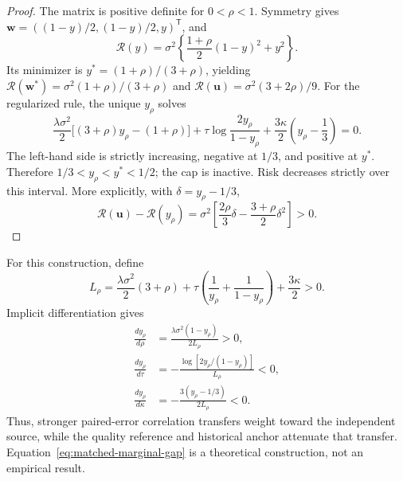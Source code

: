 \begin{proof}
The matrix is positive definite for $0<\rho<1$. Symmetry gives
$\boldsymbol w=((1-y)/2,(1-y)/2,y)^{\mathsf T}$, and
\begin{equation}
 \mathcal R(y)=\sigma^2\left\{
 \frac{1+\rho}{2}(1-y)^2+y^2\right\}.
\end{equation}
Its minimizer is $y^*=(1+\rho)/(3+\rho)$, yielding
$\mathcal R(\boldsymbol w^*)=\sigma^2(1+\rho)/(3+\rho)$ and
$\mathcal R(\boldsymbol u)=\sigma^2(3+2\rho)/9$.
For the regularized rule, the unique $y_\rho$ solves
\begin{equation}
 \frac{\lambda\sigma^2}{2}
 \big[(3+\rho)y_\rho-(1+\rho)\big]
 +\tau\log\frac{2y_\rho}{1-y_\rho}
 +\frac{3\kappa}{2}\left(y_\rho-\frac13\right)=0.
 \label{eq:regularized-three-source-root}
\end{equation}
The left-hand side is strictly increasing, negative at $1/3$, and positive
at $y^*$. Therefore $1/3<y_\rho<y^*<1/2$; the cap is inactive.
Risk decreases strictly over this interval. More explicitly, with
$\delta=y_\rho-1/3$,
\begin{equation}
 \mathcal R(\boldsymbol u)-\mathcal R(y_\rho)
 =\sigma^2\left[
 \frac{2\rho}{3}\delta-\frac{3+\rho}{2}\delta^2\right]>0.
 \label{eq:regularized-risk-gain}
\end{equation}
\end{proof}

For this construction, define
\begin{equation}
 L_\rho=\frac{\lambda\sigma^2}{2}(3+\rho)
 +\tau\left(\frac1{y_\rho}+\frac1{1-y_\rho}\right)
 +\frac{3\kappa}{2}>0.
\end{equation}
Implicit differentiation gives
\begin{align}
 \frac{d y_\rho}{d\rho}
 &=\frac{\lambda\sigma^2(1-y_\rho)}{2L_\rho}>0,\\
 \frac{d y_\rho}{d\tau}
 &=-\frac{\log[2y_\rho/(1-y_\rho)]}{L_\rho}<0,\\
 \frac{d y_\rho}{d\kappa}
 &=-\frac{3(y_\rho-1/3)}{2L_\rho}<0.
 \label{eq:correlation-regularization-sensitivity}
\end{align}
Thus, stronger paired-error correlation transfers weight toward the
independent source, while the quality reference and historical anchor
attenuate that transfer. Equation~\eqref{eq:matched-marginal-gap} is a
theoretical construction, not an empirical result.

